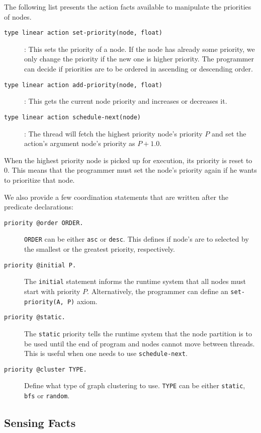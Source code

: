 The following list presents the action facts available to manipulate the priorities of nodes.

\begin{description}
   \item[\texttt{type linear action set-priority(node, float)}]: This sets the priority of a node. If the node has already some priority, we only change the priority if the new one is higher priority. The programmer can decide if priorities are to be ordered in ascending or descending order.
   \item[\texttt{type linear action add-priority(node, float)}]: This gets the current node priority and increases or decreases it.
   \item[\texttt{type linear action schedule-next(node)}]: The thread will fetch the highest priority node's priority $P$ and set the action's argument node's priority as $P + 1.0$.
\end{description}

When the highest priority node is picked up for execution, its priority is reset to 0. This means that
the programmer must set the node's priority again if he wants to prioritize that node.

We also provide a few coordination statements that are written after the predicate declarations:

\begin{description}
   \item[\texttt{priority @order ORDER.}] \texttt{ORDER} can be either \texttt{asc} or \texttt{desc}. This defines if node's are to selected by the smallest or the greatest priority, respectively.
   \item[\texttt{priority @initial P.}] The \texttt{initial} statement informs the runtime system that all nodes must start with priority $P$. Alternatively, the programmer can define an \texttt{set-priority(A, P)} axiom.
   \item[\texttt{priority @static.}] The \texttt{static} priority tells the runtime system that the node partition is to be used until the end of program and nodes cannot move between threads. This is useful when one needs to use \texttt{schedule-next}.
   \item[\texttt{priority @cluster TYPE.}] Define what type of graph clustering to use. \texttt{TYPE} can be either \texttt{static}, \texttt{bfs} or \texttt{random}.
\end{description}

\subsection{Sensing Facts}

